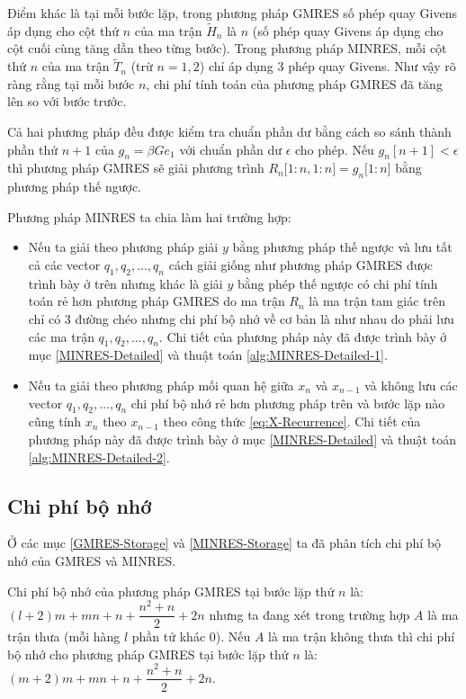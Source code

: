 \documentclass[14pt, a4paper]{article}
\numberwithin{equation}{section}
\numberwithin{algorithm}{section}
\numberwithin{figure}{section}
\numberwithin{dl}{section}
\numberwithin{md}{section}
\numberwithin{bd}{section}
\numberwithin{dn}{section}
\begin{document}
Điểm khác là tại mỗi bước lặp, trong phương pháp GMRES số phép quay Givens áp dụng cho cột thứ $n$ của ma trận $\widetilde{H}_n$ là $n$ (số phép quay Givens áp dụng cho cột cuối cùng tăng dần theo từng bước). Trong phương pháp MINRES, mỗi cột thứ $n$ của ma trận $\widetilde{T}_n$ (trừ $n=1,2$) chỉ áp dụng 3 phép quay Givens. Như vậy rõ ràng rằng tại mỗi bước $n$, chi phí tính toán của phương pháp GMRES đã tăng lên so với bước trước.

Cả hai phương pháp đều được kiểm tra chuẩn phần dư bằng cách so sánh thành phần thứ $n+1$ của $g_n=\beta G e_1$ với chuẩn phần dư $\epsilon$ cho phép. Nếu $g_n[n+1] < \epsilon$ thì phương pháp GMRES sẽ giải phương trình $R_n \lbrack 1:n, 1:n \rbrack = g_n \lbrack 1:n \rbrack$ bằng phương pháp thế ngược.

Phương pháp MINRES ta chia làm hai trường hợp:

\begin{itemize}
    \item Nếu ta giải theo phương pháp giải $y$ bằng phương pháp thế ngược và lưu tất cả các vector $q_1, q_2, \dots, q_n$ cách giải giống như phương pháp GMRES được trình bày ở trên nhưng khác là giải $y$ bằng phép thế ngược có chi phí tính toán rẻ hơn phương pháp GMRES do ma trận $R_n$ là ma trận tam giác trên chỉ có 3 đường chéo nhưng chi phí bộ nhớ về cơ bản là như nhau do phải lưu các ma trận $q_1, q_2, \dots, q_n$. Chi tiết của phương pháp này đã được trình bày ở mục \ref{MINRES-Detailed} và thuật toán \ref{alg:MINRES-Detailed-1}.
    \item Nếu ta giải theo phương pháp mối quan hệ giữa $x_n$ và $x_{n-1}$ và không lưu các vector $q_1, q_2, \dots, q_n$ chi phí bộ nhớ rẻ hơn phương pháp trên và bước lặp nào cũng tính $x_n$ theo $x_{n-1}$ theo công thức \ref{eq:X-Recurrence}. Chi tiết của phương pháp này đã được trình bày ở mục \ref{MINRES-Detailed} và thuật toán \ref{alg:MINRES-Detailed-2}.
\end{itemize}

\subsection{Chi phí bộ nhớ}

Ở các mục \ref{GMRES-Storage} và \ref{MINRES-Storage} ta đã phân tích chi phí bộ nhớ của GMRES và MINRES.

Chi phí bộ nhớ của phương pháp GMRES tại bước lặp thứ $n$ là: $(l+2)m + mn + n + \dfrac{n^2 + n}{2} + 2n$ nhưng ta đang xét trong trường hợp $A$ là ma trận thưa (mỗi hàng $l$ phần tử khác 0). Nếu $A$ là ma trận không thưa thì chi phí bộ nhớ cho phương pháp GMRES tại bước lặp thứ $n$ là: $(m+2)m + mn + n + \dfrac{n^2 + n}{2} + 2n$.
\end{document}
